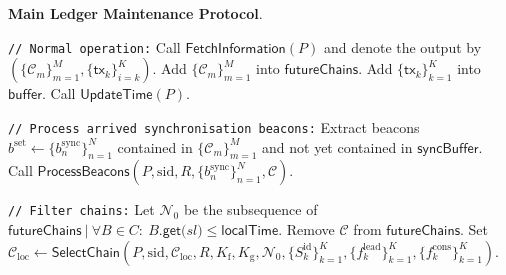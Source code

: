 \bigbreak
\bigbreak
\noindent
{}
\textbf{Main Ledger Maintenance Protocol}.\label{apndx:main-ledger-protocol}
\begin{protocol}
    \caption{$\textsf{LedgerMaintenance}(P, \text{sid}, \mathcal{C}_{\text{loc}}, R, K_{\text{f}}, K_{\text{g}}, \mathbf{S}_k^{\text{set}} = \{S_k^{\text{id}}\}_{k=1}^K, \mathbf{f}_{k, \text{lead}}^{\text{set}} =  \{f^{\text{lead}}_k\}_{k=1}^K,
    \mathbf{f}_{k, \text{cons}}^{\text{set}} = \{f^{\text{cons}}_k\}_{k=1}^K)$}
    \begin{algorithmic}[1]

        \noindent
        \lstinline|// Normal operation:|
        \State Call $\textsf{FetchInformation}(P)$ and denote the output by $(\{\mathcal{C}_m\}_{m=1}^M, \{\textsf{tx}_k\}_{i=k}^K)$.
        \State Add $\{\mathcal{C}_m\}_{m=1}^M$ into $\textsf{futureChains}$.
        \State Add $\{\textsf{tx}_k\}_{k=1}^K$ into $\textsf{buffer}$.
        \State Call $\textsf{UpdateTime}(P)$.

        \noindent
        \lstinline|// Process arrived synchronisation beacons:|
        \State Extract beacons $b^{\text{set}} \leftarrow \{b^{\text{sync}}_n\}_{n=1}^N$ contained in $\{\mathcal{C}_m\}_{m=1}^M$ and not yet contained in $\textsf{syncBuffer}$.
        \State Call $\textsf{ProcessBeacons}(P, \text{sid}, R, \{b^{\text{sync}}_n\}_{n=1}^N, \mathcal{C})$.

        \noindent
        \lstinline|// Filter chains:|
        \State Let $\mathcal{N}_0$ be the subsequence of $\textsf{futureChains}\ |\ \forall B \in C:\ B{\textsf{.get(} sl \textsf{)}} \leq \textsf{localTime}$.
            \State Remove $\mathcal{C}$ from $\textsf{futureChains}$.
        \EndFor
        \State Set $\mathcal{C}_{\text{loc}} \leftarrow \textsf{SelectChain}(P, \text{sid}, \mathcal{C}_{\text{loc}}, R, K_{\text{f}}, K_{\text{g}}, \mathcal{N}_0, \{S_k^{\text{id}}\}_{k=1}^K, \{f^{\text{lead}}_k\}_{k=1}^K, \{f^{\text{cons}}_k\}_{k=1}^K)$.


\end{algorithmic}
\end{protocol}
